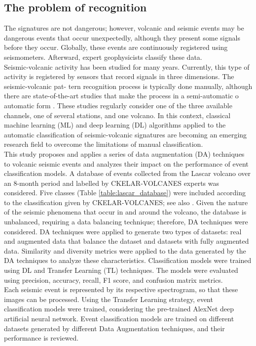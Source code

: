 \documentclass[journal]{IEEEtran}
\begin{document}
\subsection{The problem of recognition}
The signatures are not dangerous; however, volcanic and seismic events may be dangerous events that occur unexpectedly, although they present some signals before they occur. Globally, these events are continuously registered using seismometers. Afterward, expert geophysicists classify these data.\\
Seismic-volcanic activity has been studied for many years. Currently, this type of activity is registered by sensors that record signals in three dimensions. The seismic-volcanic pat- tern recognition process is typically done manually, although there are state-of-the-art studies that make the process in a semi-automatic o automatic form \cite{salazar2022multi,salazar2020deep,malfante2018automatic,bicego2012classification,curilem2016pattern, lara2020automatic}. These studies regularly consider one of the three available channels, one of several stations, and one volcano. In this context, classical machine learning (ML) and deep learning (DL) algorithms applied to the automatic classification of seismic-volcanic signatures are becoming an emerging research field to overcome the limitations of manual classification.\\
This study proposes and applies a series of data augmentation (DA) techniques to volcanic seismic events and analyzes their impact on the performance of event classification models. A database of events collected from the Lascar volcano over  an 8-month period and labelled by CKELAR-VOLCANES experts was considered. Five classes (Table \ref{table:lascar_database}) were included according to the classification given by CKELAR-VOLCANES; see also \cite{salazar2022multi}. Given the nature of the seismic phenomena that occur in and around the volcano, the database is unbalanced, requiring a data balancing technique; therefore, DA techniques were considered. DA techniques were applied to generate two types of datasets: real and augmented data that balance the dataset and datasets with fully augmented data. Similarity and diversity metrics were applied to the data generated by the DA techniques to analyze these characteristics. Classification models were trained using DL and Transfer Learning (TL) techniques. The models were evaluated using precision, accuracy, recall, F1 score, and confusion matrix metrics. \\
Each seismic event is represented by its respective spectrogram, so that these images can be processed. Using the Transfer Learning strategy, event classification models were trained, considering the pre-trained AlexNet deep artificial neural network. Event classification models are trained on different datasets generated by different Data Augmentation techniques, and their performance is reviewed. \\
\end{document}
